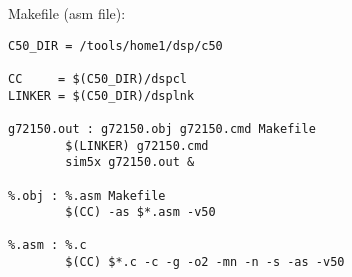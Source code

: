 Makefile (asm file):
\begin{verbatim}
C50_DIR = /tools/home1/dsp/c50

CC     = $(C50_DIR)/dspcl
LINKER = $(C50_DIR)/dsplnk

g72150.out : g72150.obj g72150.cmd Makefile
        $(LINKER) g72150.cmd
        sim5x g72150.out &

%.obj : %.asm Makefile
        $(CC) -as $*.asm -v50

%.asm : %.c
        $(CC) $*.c -c -g -o2 -mn -n -s -as -v50
\end{verbatim}